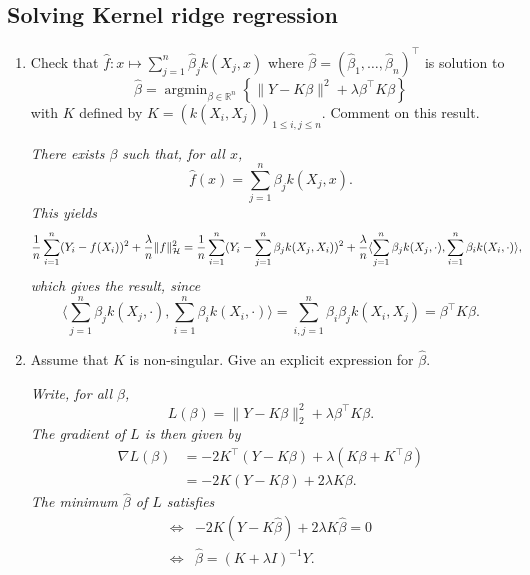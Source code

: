 \documentclass[a4paper,10pt,fleqn]{article}
\newcommand{\R}{\ensuremath{\mathbb{R}}}
\newcommand{\1}{\ensuremath{\mathbbm{1}}}
\newcommand{\argmin}{\mathop{\textrm{argmin}}}
\begin{document}
	\subsection*{Solving Kernel ridge regression}
\begin{enumerate}
	\item Check that $\widehat f:x\mapsto \sum_{j=1}^n\widehat \beta_{j}k(X_{j},x)$ where $\widehat \beta=(\widehat \beta_{1},\ldots,\widehat \beta_{n})^\top$ is solution to
	$$ \widehat \beta=\argmin_{\beta\in\R^n}\left\{\|Y-K\beta\|^2+{\lambda} \beta^\top K\beta\right\}$$
	with $K$ defined by $K=(k(X_{i},X_{j}))_{1\leq i,j\leq n}$. Comment on this result.

\vspace{.2cm}

{\em
There exists $ \beta$ such that, for all $x$,
$$
			\widehat{f}(x) = \sum_{j=1}^n \beta_j k(X_j, x).
$$
This yields
		\begin{align*}
			{1\over n}\sum_{i=1}^n(Y_{i}-f(X_{i}))^2+{\lambda\over n} \|f\|_{\mathcal{H}}^2 
			& = {1\over n}\sum_{i=1}^n(Y_{i}-\sum_{j=1}^n \beta_j k(X_j, X_i))^2+{\lambda\over n} \langle \sum_{j=1}^n \beta_j k(X_j, \cdot), \sum_{i=1}^n \beta_i k(X_i, \cdot) \rangle,
		\end{align*}
	which gives the result, since 
$$
		\langle \sum_{j=1}^n \beta_j k(X_j, \cdot), \sum_{i=1}^n \beta_i k(X_i, \cdot) \rangle  = \sum_{i,j=1}^n \beta_i \beta_j k(X_i, X_j) = \beta^\top K \beta.
$$
}
	\item Assume that $K$ is non-singular. Give an explicit expression for $\widehat \beta$.

\vspace{.2cm}

{\em
Write, for all $\beta$,
$$
			L(\beta) = \| Y - K \beta\|_2^2 + \lambda \beta^\top K \beta.
$$
		The gradient of $L$ is then given by
		\begin{align*}
			\nabla L (\beta) & = -2K^\top (Y - K \beta) + \lambda (K \beta + K^\top \beta)  \\
			& = -2K(Y-K \beta) + 2 \lambda K \beta.
	\end{align*}
	The minimum $\widehat{\beta}$ of $L$ satisfies 
	\begin{align*}
		\Leftrightarrow & -2K(Y-K \widehat{\beta}) + 2 \lambda K \widehat{\beta} = 0\\
		\Leftrightarrow & \widehat{\beta} = (K + \lambda I)^{-1} Y.
	\end{align*}
}
\end{enumerate}
\end{document}
